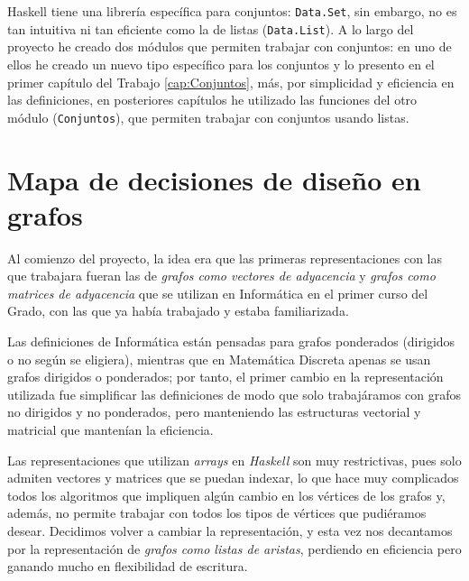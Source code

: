Haskell tiene una librería específica para conjuntos: \texttt{Data.Set}, sin
embargo, no es tan intuitiva ni tan eficiente como la de listas 
(\texttt{Data.List}). A lo largo del proyecto he creado dos módulos que permiten
trabajar con conjuntos: en uno de ellos he creado un nuevo tipo específico 
para los conjuntos y lo presento en el primer capítulo del Trabajo 
\ref{cap:Conjuntos}, más, por simplicidad y eficiencia en las definiciones,
en posteriores capítulos he utilizado las funciones del otro módulo 
(\texttt{Conjuntos}), que permiten trabajar con conjuntos usando listas.


\section{Mapa de decisiones de diseño en grafos}

Al comienzo del proyecto, la idea era que las primeras representaciones con las
que trabajara fueran las de \textit{grafos como vectores de adyacencia} y 
\textit{grafos como matrices de adyacencia} que se utilizan en Informática en el
primer curso del Grado, con las que ya había trabajado y estaba familiarizada. 

Las definiciones de Informática están pensadas para grafos ponderados (dirigidos
o no según se eligiera), mientras que en Matemática Discreta apenas se usan 
grafos dirigidos o ponderados; por tanto, el primer cambio en la representación 
utilizada fue simplificar las definiciones de modo que solo trabajáramos con
grafos no dirigidos y no ponderados, pero manteniendo las estructuras vectorial
y matricial que mantenían la eficiencia. 

Las representaciones que utilizan \textit{arrays} en \textit{Haskell} son muy
restrictivas, pues solo admiten vectores y matrices que se puedan indexar, lo
que hace muy complicados todos los algoritmos que impliquen algún cambio en los
vértices de los grafos y, además, no permite trabajar con todos los tipos de
vértices que pudiéramos desear. Decidimos volver a cambiar la representación, y
esta vez nos decantamos por la representación de \textit{grafos como listas de
aristas}, perdiendo en eficiencia pero ganando mucho en flexibilidad de
escritura.



